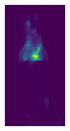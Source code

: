 \begin{figure}[H]
\begin{subfigure}[b]{\textwidth}
\begin{minipage}{0.45\textwidth}
            \includegraphics[width=0.3\textwidth]{figures/appendix/appendix_DRAEM/JB/280_mask.png}
        \end{minipage}
    \end{subfigure}


\end{figure}
